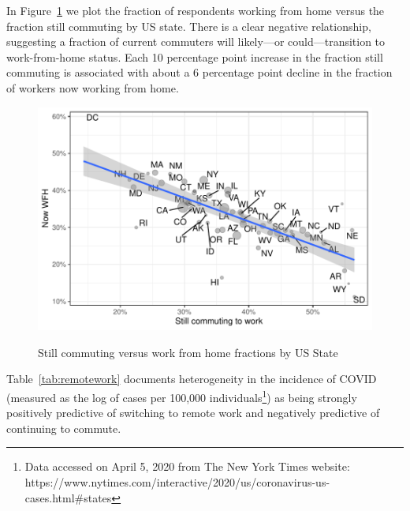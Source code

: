 \documentclass[12pt]{article}
\begin{document}
In Figure~\ref{fig:commute_vs_wfh} we plot the fraction of respondents working from home versus the fraction still commuting by US state.
There is a clear negative relationship, suggesting a fraction of current commuters will likely---or could---transition to work-from-home status.
Each 10 percentage point increase in the fraction still commuting is associated with about a 6 percentage point decline in the fraction of workers now working from home. 

\begin{figure}
  \caption{Still commuting versus work from home fractions by US State} \label{fig:commute_vs_wfh}
\centering
\begin{minipage}{0.8 \linewidth}
  \includegraphics[width = \linewidth]{plots/commute_vs_wfh.pdf} \\
  \begin{footnotesize}
    \end{footnotesize}
\end{minipage}
\end{figure} 

Table~\ref{tab:remotework} documents heterogeneity in the incidence of COVID (measured as the log of cases per 100,000 individuals\footnote{Data accessed on April 5, 2020 from The New York Times website: https://www.nytimes.com/interactive/2020/us/coronavirus-us-cases.html\#states}) as being strongly positively predictive of switching to remote work and negatively predictive of continuing to commute.

\end{document}
